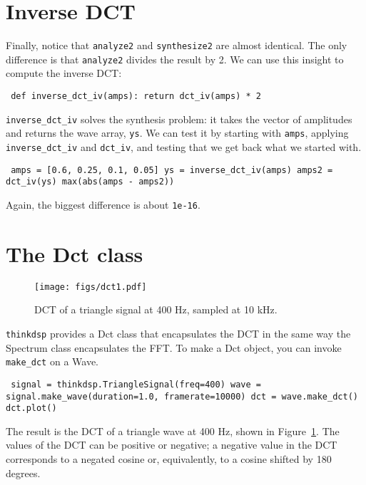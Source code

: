 \documentclass[12pt]{book} \usepackage[width=5.5in,height=8.5in, hmarginratio=3:2,vmarginratio=1:1]{geometry}
\begin{document}
\section{Inverse DCT} 

Finally, notice that {\tt analyze2} and {\tt synthesize2} are almost identical. The only difference is that {\tt analyze2} divides the result by 2. We can use this insight to compute the inverse DCT: 

\begin{verbatim} def inverse_dct_iv(amps): return dct_iv(amps) * 2 \end{verbatim} 

\verb"inverse_dct_iv" solves the synthesis problem: it takes the vector of amplitudes and returns the wave array, {\tt ys}. We can test it by starting with {\tt amps}, applying \verb"inverse_dct_iv" and \verb"dct_iv", and testing that we get back what we started with. 

\begin{verbatim} amps = [0.6, 0.25, 0.1, 0.05] ys = inverse_dct_iv(amps) amps2 = dct_iv(ys) max(abs(amps - amps2)) \end{verbatim} 

Again, the biggest difference is about {\tt 1e-16}. 

\section{The Dct class} 

\begin{figure} 

\centerline{\texttt{[image: figs/dct1.pdf]}} \caption{DCT of a triangle signal at 400 Hz, sampled at 10 kHz.} \label{fig.dct1} \end{figure} 

{\tt thinkdsp} provides a Dct class that encapsulates the DCT in the same way the Spectrum class encapsulates the FFT. To make a Dct object, you can invoke \verb"make_dct" on a Wave. 

\begin{verbatim} signal = thinkdsp.TriangleSignal(freq=400) wave = signal.make_wave(duration=1.0, framerate=10000) dct = wave.make_dct() dct.plot() \end{verbatim} 

The result is the DCT of a triangle wave at 400 Hz, shown in Figure~\ref{fig.dct1}. The values of the DCT can be positive or negative; a negative value in the DCT corresponds to a negated cosine or, equivalently, to a cosine shifted by 180 degrees. 
\end{document}
